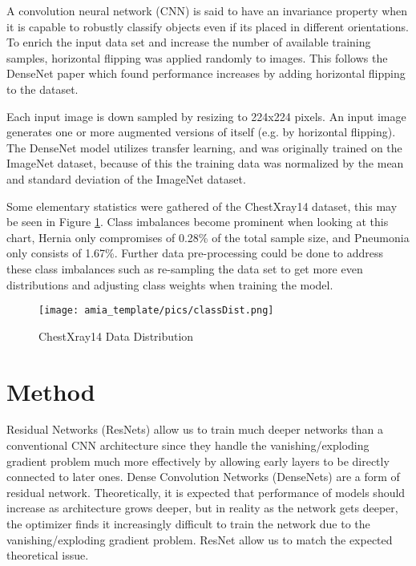 \documentclass{amia}
\begin{document}
A convolution neural network (CNN) is said to have an invariance property when it is capable to robustly classify objects even if its placed in different orientations. To enrich the input data set and increase the number of available training samples, horizontal flipping was applied randomly to images. This follows the DenseNet paper which found performance increases by adding horizontal flipping to the dataset.

Each input image is down sampled by resizing to 224x224 pixels. An input image generates one or more augmented versions of itself (e.g. by horizontal flipping). The DenseNet model utilizes transfer learning, and was originally trained on the ImageNet dataset, because of this the training data was normalized by the mean and standard deviation of the ImageNet dataset.

Some elementary statistics were gathered of the ChestXray14 dataset, this may be seen in Figure \ref{figd}. Class imbalances become prominent when looking at this chart, Hernia only compromises of 0.28\% of the total sample size, and Pneumonia only consists of 1.67\%. Further data pre-processing could be done to address these class imbalances such as re-sampling the data set to get more even distributions and adjusting class weights when training the model.
\\
\begin{figure}[H]
\centering
\texttt{[image: amia\_template/pics/classDist.png]}
\caption{ChestXray14 Data Distribution}
\label{figd}
\end{figure}

\section*{Method}
Residual Networks (ResNets) allow us to train much deeper networks than a conventional CNN architecture since they handle the vanishing/exploding gradient problem much more effectively by allowing early layers to be directly connected to later ones. Dense Convolution Networks (DenseNets) are a form of residual network. Theoretically, it is expected that performance of models should increase as architecture grows deeper, but in reality as the network gets deeper, the optimizer finds it increasingly difficult to train the network due to the vanishing/exploding gradient problem. ResNet allow us to match the expected theoretical issue.
\end{document}
